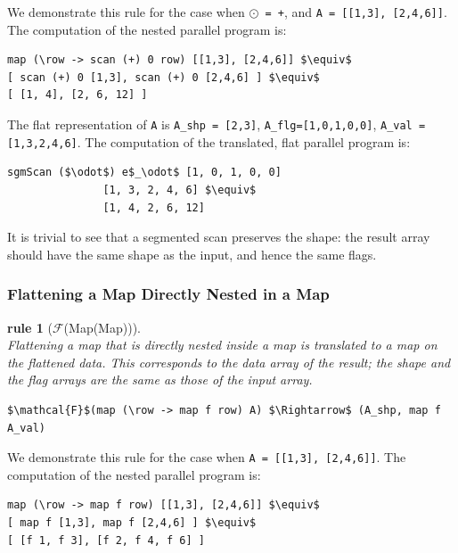 \documentclass[acmsmall,review]{acmart}\settopmatter{printfolios=true,printccs=false,printacmref=false}
\newtheorem{rewrite}{rule}
\begin{document}
We demonstrate this rule for the case when {\tt$\odot$ = +}, and 
{\tt A = [[1,3], [2,4,6]]}.
The computation of the nested parallel program is:
\begin{lstlisting}[mathescape=true]
map (\row -> scan (+) 0 row) [[1,3], [2,4,6]] $\equiv$
[ scan (+) 0 [1,3], scan (+) 0 [2,4,6] ] $\equiv$
[ [1, 4], [2, 6, 12] ]
\end{lstlisting}\vspace{-2ex}

The flat representation of {\tt A} is {\tt A\_shp = [2,3]}, 
{\tt A\_flg=[1,0,1,0,0]}, {\tt A\_val = [1,3,2,4,6]}. 
The computation of the translated, flat parallel program is:
\begin{lstlisting}[mathescape=true]
sgmScan ($\odot$) e$_\odot$ [1, 0, 1, 0, 0] 
               [1, 3, 2, 4, 6] $\equiv$
               [1, 4, 2, 6, 12]
\end{lstlisting}\vspace{-2ex}
It is trivial to see that a segmented scan preserves the shape: 
the result array should have the same shape as the input, and
hence the same flags.

\subsubsection{Flattening a Map Directly Nested in a Map}
\label{subsubsec:map-in-map} 

\begin{rewrite}[$\mathcal{F}$(Map(Map))]\label{Flat-Map-In-Map}
$\mbox{ }$\\
Flattening a map that is directly nested inside a map is translated to a
map on the flattened data. This corresponds to the data array of the result; 
the shape and the flag arrays are the same as those of the input array.
\begin{lstlisting}[mathescape=true]
$\mathcal{F}$(map (\row -> map f row) A) $\Rightarrow$ (A_shp, map f A_val)
\end{lstlisting}\vspace{-2ex}
\end{rewrite}

We demonstrate this rule for the case when {\tt A = [[1,3], [2,4,6]]}.
The computation of the nested parallel program is:
\begin{lstlisting}[mathescape=true]
map (\row -> map f row) [[1,3], [2,4,6]] $\equiv$
[ map f [1,3], map f [2,4,6] ] $\equiv$
[ [f 1, f 3], [f 2, f 4, f 6] ]
\end{lstlisting}\vspace{-2ex}
\end{document}
